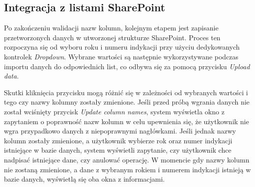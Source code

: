 
\subsection{Integracja z listami SharePoint} Po zakończeniu walidacji nazw kolumn, kolejnym etapem jest zapisanie przetworzonych danych w utworzonej strukturze SharePoint. Proces ten rozpoczyna się od wyboru roku i numeru indykacji przy użyciu dedykowanych kontrolek \emph{Dropdown}. Wybrane wartości są następnie wykorzystywane podczas importu danych do odpowiednich list, co odbywa się za pomocą przycisku \emph{Upload data}.

Skutki kliknięcia przycisku mogą różnić się w zależności od wybranych wartości i tego czy nazwy kolumny zostały zmienione. Jeśli przed próbą wgrania danych nie został wciśnięty przycisk \emph{Update column names}, system wyświetla okno z zapytaniem o poprawność nazw kolumn w celu upewnienia się, że użytkownik nie wgra przypadkowo danych z niepoprawnymi nagłówkami.
Jeśli jednak nazwy kolumn zostały zmienione, a użytkownik wybierze rok oraz numer indykacji istniejące w bazie danych, system wyświetli zapytanie, czy użytkownik chce nadpisać istniejące dane, czy anulować operację. W momencie gdy nazwy kolumn nie zostaną zmienione, a dane z wybranym rokiem i numerem indykacji istnieją w bazie danych, wyświetlą się oba okna z informacjami.



